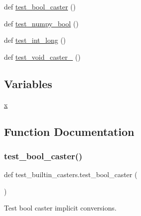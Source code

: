 \begin{DoxyCompactItemize}
\item 
def \mbox{\hyperlink{namespacetest__builtin__casters_ab133bad2180452c23542faa587a64d16}{test\+\_\+bool\+\_\+caster}} ()
\item 
def \mbox{\hyperlink{namespacetest__builtin__casters_a2d4819565c8160faefda505355e3dc28}{test\+\_\+numpy\+\_\+bool}} ()
\item 
def \mbox{\hyperlink{namespacetest__builtin__casters_abf1df1ab4e08e59866ef170bc45f7594}{test\+\_\+int\+\_\+long}} ()
\item 
def \mbox{\hyperlink{namespacetest__builtin__casters_ac170b407d9858995314cc52aa8d38de3}{test\+\_\+void\+\_\+caster\+\_}} ()
\end{DoxyCompactItemize}
\subsection*{Variables}
\begin{DoxyCompactItemize}
\item 
\mbox{\hyperlink{namespacetest__builtin__casters_a60ceadcddedff98a968a458fec3a1fc1}{x}}
\end{DoxyCompactItemize}


\subsection{Function Documentation}
\mbox{\label{namespacetest__builtin__casters_ab133bad2180452c23542faa587a64d16}} 
\subsubsection{\texorpdfstring{test\_bool\_caster()}{test\_bool\_caster()}}
{\footnotesize\ttfamily def test\+\_\+builtin\+\_\+casters.\+test\+\_\+bool\+\_\+caster (\begin{DoxyParamCaption}{ }\end{DoxyParamCaption})}

\begin{DoxyVerb}Test bool caster implicit conversions.\end{DoxyVerb}
 \mbox{\label{namespacetest__builtin__casters_acc113e89eecd8ba4326fb07e3a2fb069}} 
